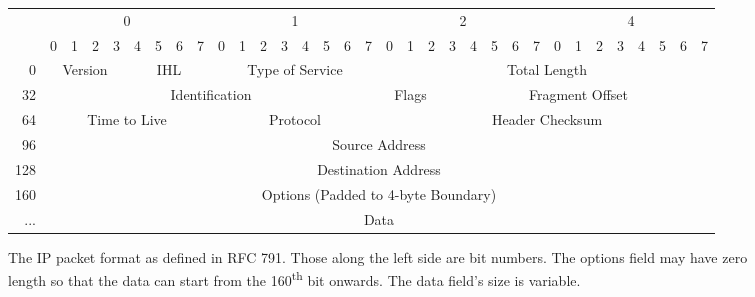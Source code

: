 \documentclass[11pt,a4paper]{report}
\newlength{\portraittextwidth}
\begin{document}
	\begin{figure}
		\begin{tabular}{r|c|c|c|c|c|c|c|c|c|c|c|c|c|c|c|c|c|c|c|c|c|c|c|c|c|c|c|c|c|c|c|c|}
		\cline{2-33}
		    & \multicolumn{8}{c|}{0}                                                                                            & \multicolumn{8}{c|}{1}               & \multicolumn{8}{c|}{2}                         & \multicolumn{8}{c|}{4}        \\ \cline{2-33} 
		    & \multicolumn{1}{l|}{0} & 1 & 2 & 3 & \multicolumn{1}{c|}{4} & \multicolumn{1}{c|}{5} & \multicolumn{1}{c|}{6} & 7 & 0  & 1  & 2  & 3  & 4  & 5  & 6  & 7 & 0       & 1       & 2      & 3 & 4 & 5 & 6 & 7 & 0 & 1 & 2 & 3 & 4 & 5 & 6 & 7 \\ \cline{2-33} 
		0   & \multicolumn{4}{c|}{Version}       & \multicolumn{4}{c|}{IHL}                                                      & \multicolumn{8}{c|}{Type of Service} & \multicolumn{16}{c|}{Total Length}                                             \\ \cline{2-33} 
		32  & \multicolumn{16}{c|}{Identification}                                                                                                                     & \multicolumn{3}{c|}{Flags} & \multicolumn{13}{c|}{Fragment Offset}             \\ \cline{2-33} 
		64  & \multicolumn{8}{c|}{Time to Live}                                                                                 & \multicolumn{8}{c|}{Protocol}        & \multicolumn{16}{c|}{Header Checksum}                                          \\ \cline{2-33} 
		96  & \multicolumn{32}{c|}{Source Address}                                                                                                                                                                                                      \\ \cline{2-33} 
		128 & \multicolumn{32}{c|}{Destination Address}                                                                                                                                                                                                 \\ \cline{2-33} 
		160 & \multicolumn{32}{c|}{Options (Padded to 4-byte Boundary)}                                                                                                                                                                                 \\ \cline{2-33} 
		... & \multicolumn{32}{c|}{Data}                                                                                                                                                                                                                \\ \cline{2-33} 
		\end{tabular}
		\captionsetup{width=\portraittextwidth}
		\caption{The IP packet format as defined in RFC 791. Those along the left side are bit numbers. The options field may have zero length so that the data can start from the 160\textsuperscript{th} bit onwards. The data field's size is variable.}
		\label{fig:ipheader}
	\end{figure}
	
\end{document}

